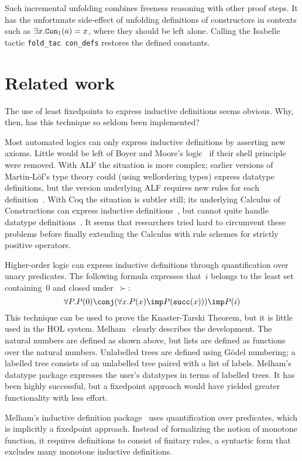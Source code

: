 Such incremental unfolding combines freeness reasoning with other proof
steps.  It has the unfortunate side-effect of unfolding definitions of
constructors in contexts such as $\exists x.\hbox{\tt Con}_1(a)=x$, where they should
be left alone.  Calling the Isabelle tactic {\tt fold\_tac con\_defs}
restores the defined constants.
\fi  %

\section{Related work}\label{related}
The use of least fixedpoints to express inductive definitions seems
obvious.  Why, then, has this technique so seldom been implemented?

Most automated logics can only express inductive definitions by asserting
new axioms.  Little would be left of Boyer and Moore's logic~\cite{bm79} if
their shell principle were removed.  With ALF the situation is more
complex; earlier versions of Martin-L\"of's type theory could (using
wellordering types) express datatype definitions, but the version
underlying ALF requires new rules for each definition~\cite{dybjer91}.
With Coq the situation is subtler still; its underlying Calculus of
Constructions can express inductive definitions~\cite{huet88}, but cannot
quite handle datatype definitions~\cite{paulin92}.  It seems that
researchers tried hard to circumvent these problems before finally
extending the Calculus with rule schemes for strictly positive operators.

Higher-order logic can express inductive definitions through quantification
over unary predicates.  The following formula expresses that~$i$ belongs to the
least set containing~0 and closed under~$\succ$:
\[ \forall P. P(0)\conj (\forall x.P(x)\imp P(\succ(x))) \imp P(i) \] 
This technique can be used to prove the Knaster-Tarski Theorem, but it is
little used in the HOL system.  Melham~\cite{melham89} clearly describes
the development.  The natural numbers are defined as shown above, but lists
are defined as functions over the natural numbers.  Unlabelled
trees are defined using G\"odel numbering; a labelled tree consists of an
unlabelled tree paired with a list of labels.  Melham's datatype package
expresses the user's datatypes in terms of labelled trees.  It has been
highly successful, but a fixedpoint approach would have yielded greater
functionality with less effort.

Melham's inductive definition package~\cite{camilleri92} uses
quantification over predicates, which is implicitly a fixedpoint approach.
Instead of formalizing the notion of monotone function, it requires
definitions to consist of finitary rules, a syntactic form that excludes
many monotone inductive definitions.

